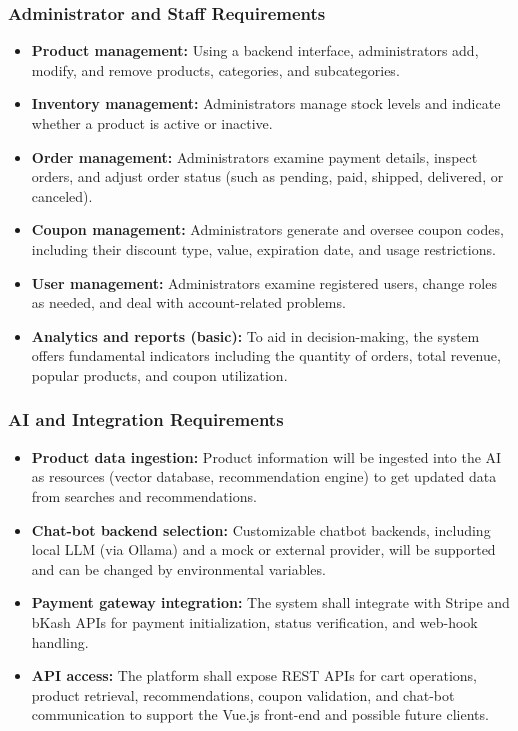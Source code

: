 \subsubsection*{Administrator and Staff Requirements}
\begin{itemize}
  \item \textbf{Product management:} Using a backend interface, administrators add, modify, and remove products, categories, and subcategories.
  \item \textbf{Inventory management:} Administrators manage stock levels and indicate whether a product is active or inactive.
  \item \textbf{Order management:} Administrators examine payment details, inspect orders, and adjust order status (such as pending, paid, shipped, delivered, or canceled).
  \item \textbf{Coupon management:} Administrators generate and oversee coupon codes, including their discount type, value, expiration date, and usage restrictions.
  \item \textbf{User management:} Administrators examine registered users, change roles as needed, and deal with account-related problems.
  \item \textbf{Analytics and reports (basic):} To aid in decision-making, the system offers fundamental indicators including the quantity of orders, total revenue, popular products, and coupon utilization.
\end{itemize}

\subsubsection*{AI and Integration Requirements}
\begin{itemize}
  \item \textbf{Product data ingestion:} Product information will be ingested into the AI as resources (vector database, recommendation engine) to get updated data from searches and recommendations.
  \item \textbf{Chat-bot backend selection:} Customizable chatbot backends, including local LLM (via Ollama) and a mock or external provider, will be supported and can be changed by environmental variables.
  \item \textbf{Payment gateway integration:} The system shall integrate with Stripe and
bKash APIs for payment initialization, status verification, and web-hook handling.
  \item \textbf{API access:} The platform shall expose REST APIs for cart operations, product
retrieval, recommendations, coupon validation, and chat-bot communication
to support the Vue.js front-end and possible future clients.
\end{itemize}

